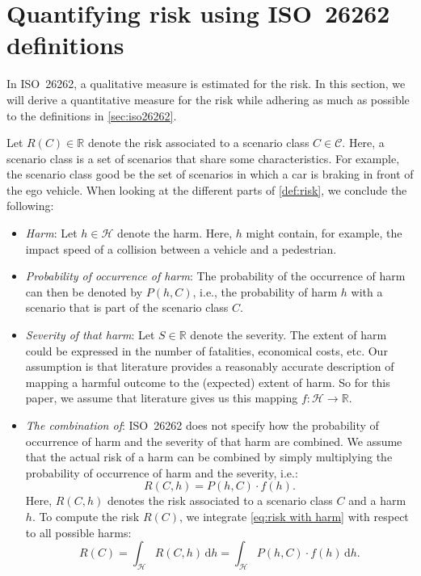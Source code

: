 \documentclass[10pt,final,a4paper,oneside,onecolumn]{article}
\newcommand*{\ud}{\mathrm{\,d}}                                 %
\theoremstyle{plain}\newtheorem{definition}{Definition}[section]    %
\theoremstyle{definition}\newtheorem{example}{Example}[section]     %
\theoremstyle{remark}\newtheorem{remarkenv}{Remark}[section]        %
\newcommand{\harm}{h}
\newcommand{\harmspace}{\mathcal{H}}
\newcommand{\mapharmseverity}{f}
\newcommand{\prob}[1]{P\left(#1\right)}
\newcommand{\risk}{R}
\newcommand{\scenarioclass}{C}
\newcommand{\scenarioclassspace}{\mathcal{C}}
\newcommand{\severity}{S}
\newcommand{\severityspace}{\mathbb{R}}
\begin{document}
\section{Quantifying risk using ISO~26262 definitions}
\label{sec:quantifying}

In ISO~26262, a qualitative measure is estimated for the risk. In this section, we will derive a quantitative measure for the risk while adhering as much as possible to the definitions in \cref{sec:iso26262}.

Let $\risk(\scenarioclass) \in \mathbb{R}$ denote the risk associated to a scenario class $\scenarioclass \in \scenarioclassspace$. Here, a scenario class is a set of scenarios that share some characteristics. For example, the scenario class good be the set of scenarios in which a car is braking in front of the ego vehicle. When looking at the different parts of \cref{def:risk}, we conclude the following:
\begin{itemize}
	\item \emph{Harm}: Let $\harm\in\mathcal{H}$ denote the harm. Here, $\harm$ might contain, for example, the impact speed of a collision between a vehicle and a pedestrian.
	\item \emph{Probability of occurrence of harm}: The probability of the occurrence of harm can then be denoted by $\prob{\harm,\scenarioclass}$, i.e., the probability of harm $\harm$ with a scenario that is part of the scenario class $\scenarioclass$.
	\item \emph{Severity of that harm}: Let $\severity \in \severityspace$ denote the severity. The extent of harm could be expressed in the number of fatalities, economical costs, etc. Our assumption is that literature provides a reasonably accurate description of mapping a harmful outcome to the (expected) extent of harm. So for this paper, we assume that literature gives us this mapping $\mapharmseverity:\harmspace\rightarrow\severityspace$.
	\item \emph{The combination of}: ISO~26262 does not specify how the probability of occurrence of harm and the severity of that harm are combined. We assume that the actual risk of a harm can be combined by simply multiplying the probability of occurrence of harm and the severity, i.e.:
	\begin{equation} \label{eq:risk with harm}
		\risk(\scenarioclass,\harm) = \prob{\harm,\scenarioclass} \cdot \mapharmseverity(\harm).
	\end{equation}
	Here, $\risk(\scenarioclass,\harm)$ denotes the risk associated to a scenario class $\scenarioclass$ and a harm $\harm$. To compute the risk $\risk(\scenarioclass)$, we integrate \cref{eq:risk with harm} with respect to all possible harms:
	\begin{equation} \label{eq:risk}
		\risk(\scenarioclass) = \int_{\harmspace} \risk(\scenarioclass,\harm) \ud \harm = \int_{\harmspace} \prob{\harm,\scenarioclass} \cdot \mapharmseverity(\harm) \ud \harm.
	\end{equation}
\end{itemize}
\end{document}
